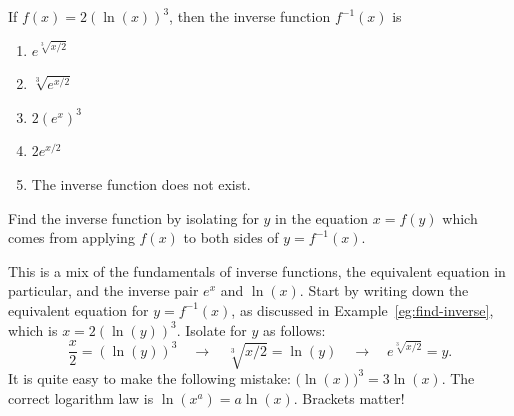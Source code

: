 \documentclass[../main.tex]{subfiles}
\begin{document}
\begin{exercise} \label{ex:midterm-practice-2}
  If \(f(x) = 2(\ln(x))^{3}\), then the inverse function \(f^{-1}(x)\) is
  \begin{enumerate}[label=\Alph*.]
    \item \(e^{\sqrt[3]{x/2}}\)
    \item \(\sqrt[3]{e^{x/2}}\)
    \item \(2(e^{x})^{3}\)
    \item \(2e^{x/2}\)
    \item The inverse function does not exist.
  \end{enumerate}

  \begin{hint}
    Find the inverse function by isolating for \(y\) in the equation \(x = f(y)\) which comes from applying \(f(x)\) to both sides of \(y = f^{-1}(x)\).
  \end{hint}
  \begin{solution}
    This is a mix of the fundamentals of inverse functions, the equivalent equation in particular, and the inverse pair \(e^{x}\) and \(\ln(x)\).  Start by writing down the equivalent equation for \(y = f^{-1}(x)\), as discussed in Example~\ref{eg:find-inverse}, which is \(x = 2(\ln(y))^{3}\). Isolate for \(y\) as follows:
    \[
      \frac{x}{2} = \left( \ln(y) \right)^{3} \quad\longrightarrow\quad \sqrt[3]{x/2} = \ln(y) \quad\longrightarrow\quad e^{\sqrt[3]{x/2}} = y.
    \]
    It is quite easy to make the following mistake: \(\Big(\ln(x)\Big)^{3} = 3\ln(x)\). The correct logarithm law is \(\ln(x^{a}) = a\ln(x)\). Brackets matter!
  \end{solution}
\end{exercise}
\nopagebreak\vfill
\end{document}
